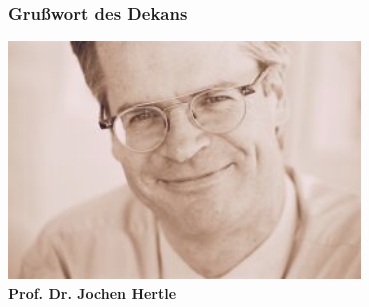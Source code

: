 \documentclass{beamer}
\begin{document}
    \begin{frame} %
    	\frametitle{Grußwort des Dekans}
    	\center
    	\includegraphics[width=0.7\textwidth]{jochen-hertle.png}
    	\\
    	\textbf{Prof. Dr. Jochen Hertle}
    \end{frame}
    
\end{document}
